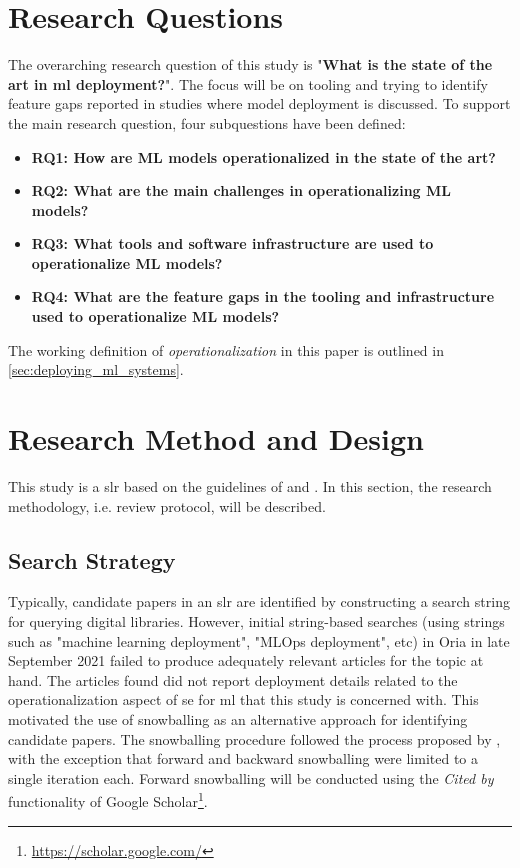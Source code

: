\section{Research Questions}
\label{sec:research_questions}
The overarching research question of this study is "\textbf{What is the state of the art in \acrshort{ml} deployment?}".
The focus will be on tooling and trying to identify feature gaps reported in studies where model deployment is discussed.
To support the main research question, four subquestions have been defined:
\begin{itemize}
    \item \textbf{RQ1: How are ML models operationalized in the state of the art?}
    \item \textbf{RQ2: What are the main challenges in operationalizing ML models?}
    \item \textbf{RQ3: What tools and software infrastructure are used to operationalize ML models?}
    \item \textbf{RQ4: What are the feature gaps in the tooling and infrastructure used to operationalize ML models?}
\end{itemize}
The working definition of \emph{operationalization} in this paper is outlined in \cref{sec:deploying_ml_systems}.

\section{Research Method and Design}
\label{sec:research_method}
This study is a \acrfull{slr} based on the guidelines of \textcite{Kitchenham07guidelinesfor} and \textcite{Wohlin2014}.
In this section, the research methodology, i.e. review protocol, will be described.

\subsection{Search Strategy}
Typically, candidate papers in an \acrshort{slr} are identified by constructing a search string for querying digital libraries.
However, initial string-based searches (using strings such as "machine learning deployment", "MLOps deployment", etc) in Oria in late September 2021 failed to produce adequately relevant articles for the topic at hand.
The articles found did not report deployment details related to the operationalization aspect of \acrshort{se} for \acrshort{ml} that this study is concerned with.
This motivated the use of snowballing as an alternative approach for identifying candidate papers.
The snowballing procedure followed the process proposed by \textcite{Wohlin2014}, with the exception that forward and backward snowballing were limited to a single iteration each.
Forward snowballing will be conducted using the \emph{Cited by} functionality of Google Scholar\footnote{\url{https://scholar.google.com/}}.

